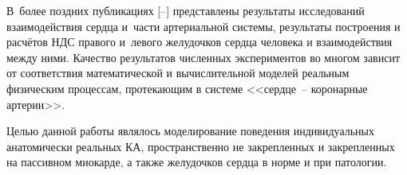 В~более поздних публикациях [--] представлены результаты исследований взаимодействия сердца и~части артериальной системы, результаты построения и расчётов НДС правого и~левого желудочков сердца человека и взаимодействия между ними. Качество результатов численных экспериментов во многом зависит от соответствия математической и вычислительной моделей реальным физическим процессам, протекающим в системе <<сердце~– коронарные артерии>>.



Целью данной работы являлось моделирование поведения индивидуальных анатомически реальных КА, пространственно не закрепленных и закрепленных на пассивном миокарде, а также желудочков сердца в норме и при патологии.







